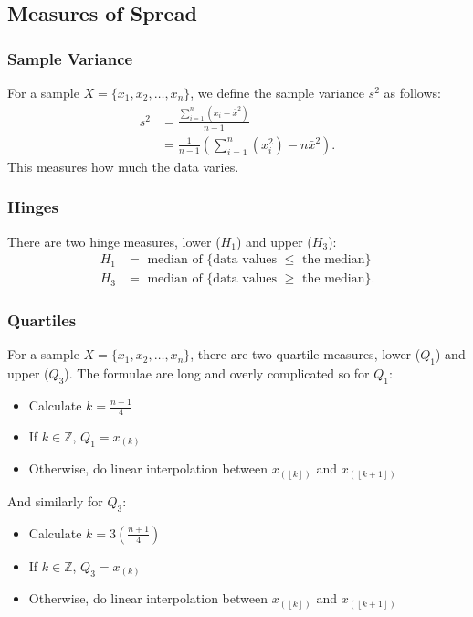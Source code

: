 \documentclass[a4paper, 12pt, twoside]{article}
\def\lf{\left\lfloor}
\def\rf{\right\rfloor}
\begin{document}
\subsection{Measures of Spread}

\subsubsection{Sample Variance}

For a sample $X = \{x_1, x_2, \ldots, x_n\}$, we define the sample
variance $s^2$ as follows:
\begin{align*}
    s^2 & = \frac{\sum_{i = 1}^n (x_i - \bar{x}^2)}{n - 1}                  \\
        & = \frac{1}{n-1}\left(\sum_{i = 1}^{n}(x_i^2) - n\bar{x}^2\right).
\end{align*}
This measures how much the data varies.

\subsubsection{Hinges}

There are two hinge measures, lower ($H_1$) and upper ($H_3$):
\begin{align*}
    H_1 & = \text{ median of \{data values } \leq \text{ the median\}}  \\
    H_3 & = \text{ median of \{data values } \geq \text{ the median\}}.
\end{align*}

\subsubsection{Quartiles}

For a sample $X = \{x_1, x_2, \ldots, x_n\}$, there are two quartile
measures, lower ($Q_1$) and upper ($Q_3$). The formulae are long and
overly complicated so for $Q_1$:

\begin{itemize}
    \item Calculate $k = \frac{n + 1}{4}$
    \item If $k \in \mathbb{Z}$, $Q_1 = x_{(k)}$
    \item Otherwise, do linear interpolation between $x_{(\lf k\rf)}$
          and $x_{(\lf k+1\rf)}$
\end{itemize}

And similarly for $Q_3$:

\begin{itemize}
    \item Calculate $k = 3\left(\frac{n + 1}{4}\right)$
    \item If $k \in \mathbb{Z}$, $Q_3 = x_{(k)}$
    \item Otherwise, do linear interpolation between $x_{(\lf k\rf)}$
          and $x_{(\lf k+1\rf)}$
\end{itemize}
\end{document}
